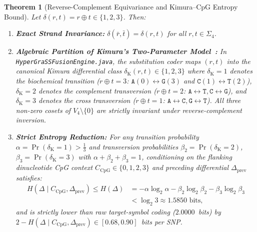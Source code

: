 \documentclass[10pt]{article}
\newtheorem{theorem}{Theorem}
\theoremstyle{definition}
\begin{document}
\begin{theorem}[Reverse-Complement Equivariance and Kimura--CpG Entropy Bound]
\label{thm:law1}
Let $\delta(r,t) = r \oplus t \in \{1,2,3\}$. Then:
\begin{enumerate}
  \item \textbf{Exact Strand Invariance:} $\delta(\bar{r}, \bar{t}) = \delta(r, t)$ for all $r,t \in \Sigma_4$.
  \item \textbf{Algebraic Partition of Kimura's Two-Parameter Model~\cite{kimura1980simple}:} In \texttt{HyperGraSSFusionEngine.java}, the substitution coder maps $(r, t)$ into the canonical Kimura differential class $\delta_{\text{K}}(r,t) \in \{1,2,3\}$ where $\delta_{\text{K}}=1$ denotes the biochemical transition ($r \oplus t = 3$: $\texttt{A}(0)\leftrightarrow\texttt{G}(3)$ and $\texttt{C}(1)\leftrightarrow\texttt{T}(2)$), $\delta_{\text{K}}=2$ denotes the complement transversion ($r \oplus t = 2$: $\texttt{A}\leftrightarrow\texttt{T}, \texttt{C}\leftrightarrow\texttt{G}$), and $\delta_{\text{K}}=3$ denotes the cross transversion ($r \oplus t = 1$: $\texttt{A}\leftrightarrow\texttt{C}, \texttt{G}\leftrightarrow\texttt{T}$). All three non-zero cosets of $V_4 \setminus \{0\}$ are strictly invariant under reverse-complement inversion.
  \item \textbf{Strict Entropy Reduction:} For any transition probability $\alpha = \Pr(\delta_{\text{K}}=1) > \frac{1}{3}$ and transversion probabilities $\beta_2 = \Pr(\delta_{\text{K}}=2)$, $\beta_3 = \Pr(\delta_{\text{K}}=3)$ with $\alpha + \beta_2 + \beta_3 = 1$, conditioning on the flanking dinucleotide CpG context $C_{\text{CpG}} \in \{0,1,2,3\}$ and preceding differential $\Delta_{\text{prev}}$ satisfies:
  \begin{equation}
  \begin{aligned}
    H(\Delta \mid C_{\text{CpG}}, \Delta_{\text{prev}}) \le H(\Delta)
    &= -\alpha\log_2\alpha - \beta_2\log_2\beta_2 - \beta_3\log_2\beta_3 \\
    &< \log_2 3 \approx 1.5850\text{ bits},
  \end{aligned}
  \end{equation}
  and is strictly lower than raw target-symbol coding ($2.0000$~bits) by $2 - H(\Delta \mid C_{\text{CpG}}, \Delta_{\text{prev}}) \in [0.68, 0.90]$~bits per SNP.
\end{enumerate}
\end{theorem}
\end{document}
